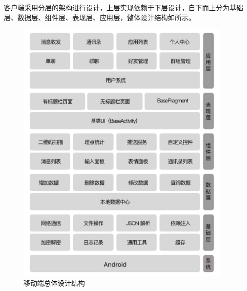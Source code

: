 		客户端采用分层的架构进行设计，上层实现依赖于下层设计，自下而上分为基础层、数据层、组件层、表现层、应用层，整体设计结构如所示。
	
	\begin{figure}[H]
		\centering
		\includegraphics[width=0.95\textwidth]{images/mobile_design}
		\caption{移动端总体设计结构}
		\label{mobile_overall_design}
	\end{figure}


